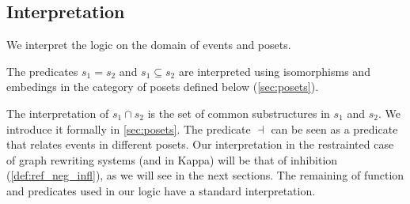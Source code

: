 \subsection{Interpretation}

We interpret the logic on the domain of events and posets.


The predicates $s_1 = s_2$ and $s_1\subseteq s_2$ are interpreted using isomorphisms and embedings in the category of posets defined below (\autoref{sec:posets}).

The interpretation of $s_1\cap s_2$ is the set of common substructures in $s_1$ and $s_2$. We introduce it formally in \autoref{sec:posets}. The predicate $\dashv$ can be seen as a predicate that relates events in different posets. Our interpretation in the restrainted case of graph rewriting systems (and in Kappa) will be that of inhibition (\autoref{def:ref_neg_infl}), as we will see in the next sections. The remaining of function and predicates used in our logic have a standard interpretation.

